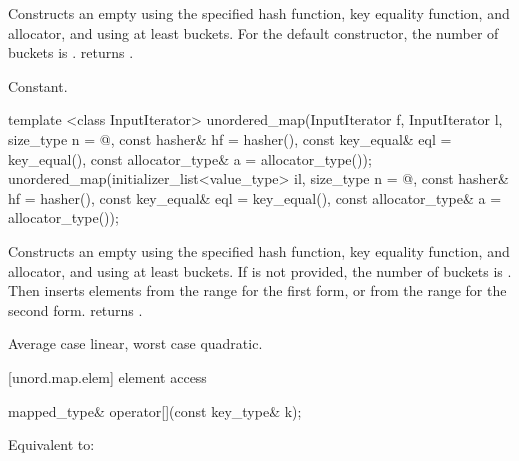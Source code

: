 \begin{itemdescr}
\pnum
\effects Constructs an empty  using the
specified hash function, key equality function, and allocator, and
using at least  buckets.  For the default constructor,
the number of buckets is .
 returns .

\pnum
\complexity Constant.
\end{itemdescr}

%
\begin{itemdecl}
template <class InputIterator>
  unordered_map(InputIterator f, InputIterator l,
                size_type n = @\seebelow@,
                const hasher& hf = hasher(),
                const key_equal& eql = key_equal(),
                const allocator_type& a = allocator_type());
unordered_map(initializer_list<value_type> il,
              size_type n = @\seebelow@,
              const hasher& hf = hasher(),
              const key_equal& eql = key_equal(),
              const allocator_type& a = allocator_type());
\end{itemdecl}

\begin{itemdescr}
\pnum
\effects Constructs an empty  using the
specified hash function, key equality function, and allocator, and
using at least  buckets. If  is not
provided, the number of buckets is . Then
inserts elements from the range 
for the first form, or from the range
 for the second form.
 returns .

\pnum
\complexity Average case linear, worst case quadratic.
\end{itemdescr}

[unord.map.elem]{ element access}

%
%
\begin{itemdecl}
mapped_type& operator[](const key_type& k);
\end{itemdecl}

\begin{itemdescr}
\pnum
\effects Equivalent to: 
\end{itemdescr}

